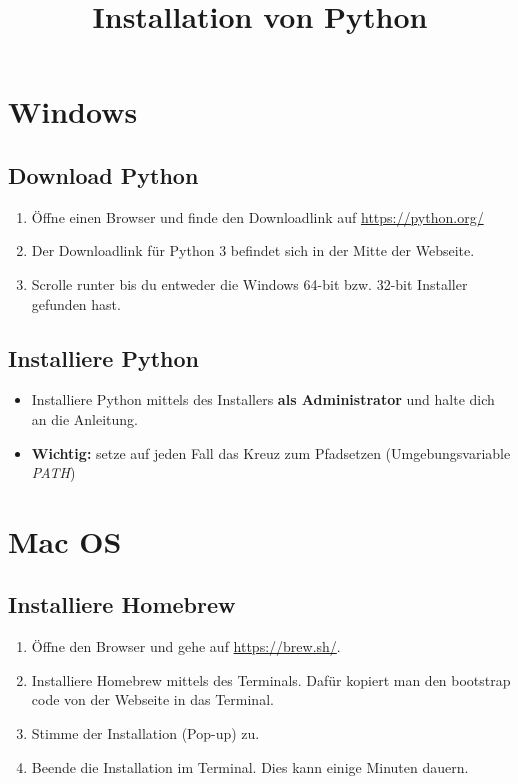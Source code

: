 \documentclass[accentcolor=3c,colorbacktitle,12pt]{tudaexercise}
\title{Installation von Python}
\begin{document}
\maketitle



\section*{Windows}
\subsection*{Download Python}
\begin{enumerate}
	\item Öffne einen Browser und finde den Downloadlink auf \url{https://python.org/}
	\item Der Downloadlink für Python 3 befindet sich in der Mitte der Webseite.
	\item Scrolle runter bis du entweder die Windows 64-bit bzw. 32-bit Installer gefunden hast.
\end{enumerate}
\subsection*{Installiere Python}
\begin{itemize}
	\item Installiere Python mittels des Installers \textbf{als Administrator} und halte dich an die Anleitung. 
	\item \textbf{Wichtig:} setze auf jeden Fall das Kreuz zum Pfadsetzen (Umgebungsvariable \emph{PATH})
\end{itemize}

\section*{Mac OS}
\subsection*{Installiere Homebrew}
\begin{enumerate}
	\item Öffne den Browser und gehe auf \url{https://brew.sh/}. \item Installiere Homebrew mittels des Terminals. Dafür kopiert man den bootstrap code von der Webseite in das Terminal.
	\item Stimme der Installation (Pop-up) zu.
	\item Beende die Installation im Terminal. Dies kann einige Minuten dauern.
\end{enumerate}
\end{document}
